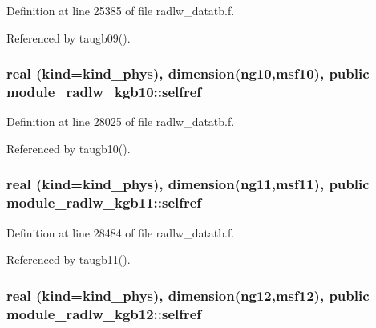 Definition at line 25385 of file radlw\+\_\+datatb.\+f.



Referenced by taugb09().

\subsubsection[{\texorpdfstring{selfref}{selfref}}]{\setlength{\rightskip}{0pt plus 5cm}real (kind=kind\+\_\+phys), dimension(ng10,msf10), public module\+\_\+radlw\+\_\+kgb10\+::selfref}\hypertarget{group__module__radlw__main_ga48247dea283a611ebe57dd1c164dda69}{}\label{group__module__radlw__main_ga48247dea283a611ebe57dd1c164dda69}


Definition at line 28025 of file radlw\+\_\+datatb.\+f.



Referenced by taugb10().

\subsubsection[{\texorpdfstring{selfref}{selfref}}]{\setlength{\rightskip}{0pt plus 5cm}real (kind=kind\+\_\+phys), dimension(ng11,msf11), public module\+\_\+radlw\+\_\+kgb11\+::selfref}\hypertarget{group__module__radlw__main_gac98edefcce668d56c3aadc241863741f}{}\label{group__module__radlw__main_gac98edefcce668d56c3aadc241863741f}


Definition at line 28484 of file radlw\+\_\+datatb.\+f.



Referenced by taugb11().

\subsubsection[{\texorpdfstring{selfref}{selfref}}]{\setlength{\rightskip}{0pt plus 5cm}real (kind=kind\+\_\+phys), dimension(ng12,msf12), public module\+\_\+radlw\+\_\+kgb12\+::selfref}\hypertarget{group__module__radlw__main_ga8aaf83ec7a08a244fd1e5396c9fd9b1d}{}\label{group__module__radlw__main_ga8aaf83ec7a08a244fd1e5396c9fd9b1d}


